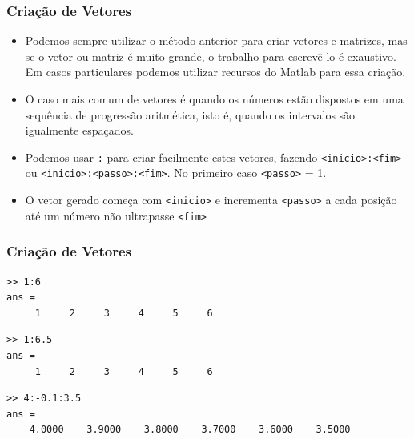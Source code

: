 \documentclass{beamer}
\newcommand{\ssiz}{\scriptsize}
\begin{document}
\begin{frame}[fragile]
\frametitle{Cria\c{c}\~ao de Vetores}
\begin{itemize}
\item<1-> Podemos sempre utilizar o m\'etodo anterior para criar vetores e matrizes, mas se o vetor ou matriz \'e muito grande, o trabalho para escrev\^e-lo \'e exaustivo. Em casos particulares podemos utilizar recursos do Matlab para essa cria\c{c}\~ao.
\item<2-> O caso mais comum de vetores \'e quando os n\'umeros est\~ao dispostos em uma sequ\^encia de progress\~ao aritm\'etica, isto \'e, quando os intervalos s\~ao igualmente espa\c{c}ados.
\item<3-> Podemos usar {\tt :} para criar facilmente estes vetores, fazendo {\tt <inicio>:<fim>} ou {\tt <inicio>:<passo>:<fim>}. No primeiro caso {\tt <passo>} = 1.
\item<4-> O vetor gerado come\c{c}a com {\tt <inicio>} e incrementa {\tt <passo>} a cada posi\c{c}\~ao at\'e um n\'umero n\~ao ultrapasse {\tt <fim>}
\end{itemize}

\end{frame}

\begin{frame}[fragile]
\frametitle{Cria\c{c}\~ao de Vetores}
{\ssiz
\begin{verbatim}
>> 1:6
ans =
     1     2     3     4     5     6
\end{verbatim}
\pause
\begin{verbatim}
>> 1:6.5
ans =
     1     2     3     4     5     6
\end{verbatim}
\pause
\begin{verbatim}
>> 4:-0.1:3.5
ans =
    4.0000    3.9000    3.8000    3.7000    3.6000    3.5000
\end{verbatim}
}
\end{frame}
\end{document}
